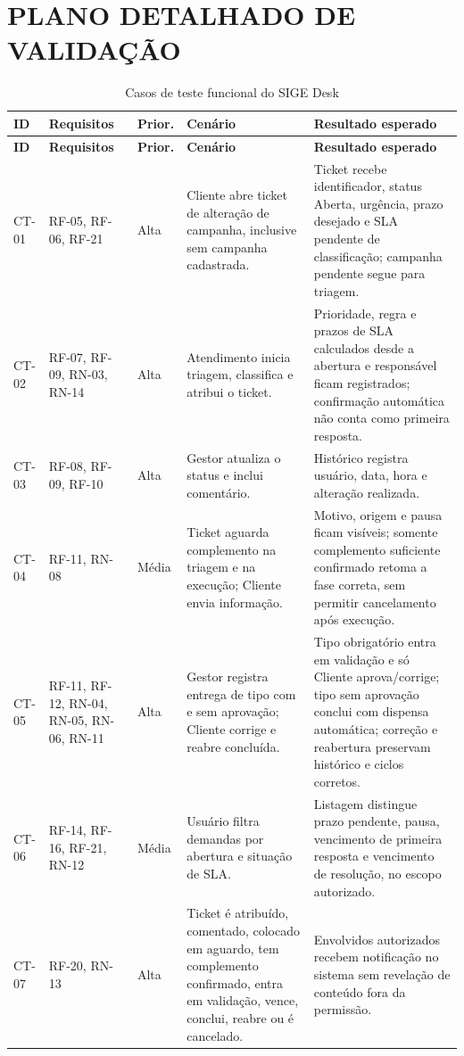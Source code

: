 \section{PLANO DETALHADO DE VALIDAÇÃO}
\label{ap:validacao}

\begin{longtable}{p{}p{}p{}p{}p{}}
\caption{Casos de teste funcional do SIGE Desk}\label{tab:casos-teste}\\
\hline
\textbf{ID} & \textbf{Requisitos} & \textbf{Prior.} & \textbf{Cenário} & \textbf{Resultado esperado} \\
\hline
\endfirsthead
\hline
\textbf{ID} & \textbf{Requisitos} & \textbf{Prior.} & \textbf{Cenário} & \textbf{Resultado esperado} \\
\hline
\endhead
CT-01 & RF-05, RF-06, RF-21 & Alta & Cliente abre ticket de alteração de campanha, inclusive sem campanha cadastrada. & Ticket recebe identificador, status Aberta, urgência, prazo desejado e SLA pendente de classificação; campanha pendente segue para triagem. \\
CT-02 & RF-07, RF-09, RN-03, RN-14 & Alta & Atendimento inicia triagem, classifica e atribui o ticket. & Prioridade, regra e prazos de SLA calculados desde a abertura e responsável ficam registrados; confirmação automática não conta como primeira resposta. \\
CT-03 & RF-08, RF-09, RF-10 & Alta & Gestor atualiza o status e inclui comentário. & Histórico registra usuário, data, hora e alteração realizada. \\
CT-04 & RF-11, RN-08 & Média & Ticket aguarda complemento na triagem e na execução; Cliente envia informação. & Motivo, origem e pausa ficam visíveis; somente complemento suficiente confirmado retoma a fase correta, sem permitir cancelamento após execução. \\
CT-05 & RF-11, RF-12, RN-04, RN-05, RN-06, RN-11 & Alta & Gestor registra entrega de tipo com e sem aprovação; Cliente corrige e reabre concluída. & Tipo obrigatório entra em validação e só Cliente aprova/corrige; tipo sem aprovação conclui com dispensa automática; correção e reabertura preservam histórico e ciclos corretos. \\
CT-06 & RF-14, RF-16, RF-21, RN-12 & Média & Usuário filtra demandas por abertura e situação de SLA. & Listagem distingue prazo pendente, pausa, vencimento de primeira resposta e vencimento de resolução, no escopo autorizado. \\
CT-07 & RF-20, RN-13 & Alta & Ticket é atribuído, comentado, colocado em aguardo, tem complemento confirmado, entra em validação, vence, conclui, reabre ou é cancelado. & Envolvidos autorizados recebem notificação no sistema sem revelação de conteúdo fora da permissão. \\

\end{longtable}
